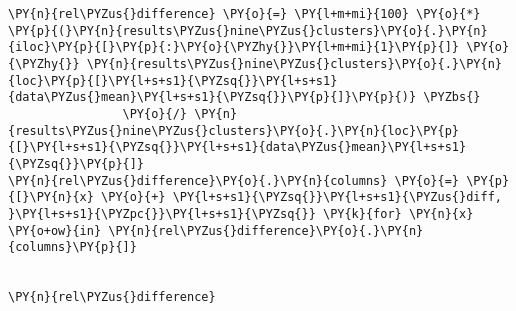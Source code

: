     \begin{tcolorbox}[breakable, size=fbox, boxrule=1pt, pad at break*=1mm,colback=cellbackground, colframe=cellborder]
\begin{Verbatim}[commandchars=\\\{\}]
\PY{n}{rel\PYZus{}difference} \PY{o}{=} \PY{l+m+mi}{100} \PY{o}{*} \PY{p}{(}\PY{n}{results\PYZus{}nine\PYZus{}clusters}\PY{o}{.}\PY{n}{iloc}\PY{p}{[}\PY{p}{:}\PY{o}{\PYZhy{}}\PY{l+m+mi}{1}\PY{p}{]} \PY{o}{\PYZhy{}} \PY{n}{results\PYZus{}nine\PYZus{}clusters}\PY{o}{.}\PY{n}{loc}\PY{p}{[}\PY{l+s+s1}{\PYZsq{}}\PY{l+s+s1}{data\PYZus{}mean}\PY{l+s+s1}{\PYZsq{}}\PY{p}{]}\PY{p}{)} \PYZbs{}
                \PY{o}{/} \PY{n}{results\PYZus{}nine\PYZus{}clusters}\PY{o}{.}\PY{n}{loc}\PY{p}{[}\PY{l+s+s1}{\PYZsq{}}\PY{l+s+s1}{data\PYZus{}mean}\PY{l+s+s1}{\PYZsq{}}\PY{p}{]}
\PY{n}{rel\PYZus{}difference}\PY{o}{.}\PY{n}{columns} \PY{o}{=} \PY{p}{[}\PY{n}{x} \PY{o}{+} \PY{l+s+s1}{\PYZsq{}}\PY{l+s+s1}{\PYZus{}diff, }\PY{l+s+s1}{\PYZpc{}}\PY{l+s+s1}{\PYZsq{}} \PY{k}{for} \PY{n}{x} \PY{o+ow}{in} \PY{n}{rel\PYZus{}difference}\PY{o}{.}\PY{n}{columns}\PY{p}{]}


\PY{n}{rel\PYZus{}difference} 
\end{Verbatim}
\end{tcolorbox}


